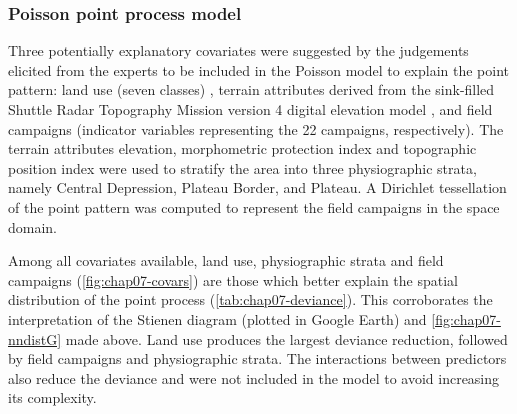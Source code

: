 \subsubsection{Poisson point process model}

Three potentially explanatory covariates were suggested by the judgements elicited from the experts to be 
included in the Poisson model to explain the point pattern: land use (seven classes) 
\cite{SamuelRosaEtAl2011a}, terrain attributes derived from the sink-filled Shuttle Radar Topography Mission 
version \num{4} digital elevation model \cite{ReuterEtAl2007}, and field campaigns (indicator variables 
representing the 22 campaigns, respectively). The terrain attributes elevation, morphometric protection index 
and topographic position index were used to stratify the area into three physiographic strata, namely Central 
Depression, Plateau Border, and Plateau. A Dirichlet tessellation of the point pattern was computed to 
represent the field campaigns in the space domain.

Among all covariates available, land use, physiographic strata and field campaigns 
(\autoref{fig:chap07-covars}) are those which better explain the spatial distribution of the point process 
(\autoref{tab:chap07-deviance}). This corroborates the interpretation of the Stienen diagram (plotted in 
Google Earth\rr{}) and \autoref{fig:chap07-nndistG} made above. Land use produces the largest deviance 
reduction, followed by field campaigns and physiographic strata. The interactions between predictors also 
reduce the deviance and were not included in the model to avoid increasing its complexity.


